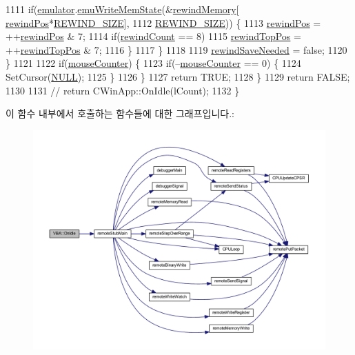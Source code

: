 \begin{DoxyCode}
1111         \textcolor{keywordflow}{if}(\mbox{\hyperlink{class_v_b_a_ab40fc008c6714c3c8670eb8a9085a4a1}{emulator}}.\mbox{\hyperlink{struct_emulated_system_a91e29689742db5aa32a73c2f5698605a}{emuWriteMemState}}(&\mbox{\hyperlink{class_v_b_a_ad2f4e21586cc185a1e6525080532471a}{rewindMemory}}[
      \mbox{\hyperlink{class_v_b_a_a5d8ea18c98b5188813210a84819da5e8}{rewindPos}}*\mbox{\hyperlink{_s_d_l_8cpp_ac23853e466152bcbd456ac1e976f4e84}{REWIND\_SIZE}}], 
1112                                      \mbox{\hyperlink{_s_d_l_8cpp_ac23853e466152bcbd456ac1e976f4e84}{REWIND\_SIZE}})) \{
1113           \mbox{\hyperlink{class_v_b_a_a5d8ea18c98b5188813210a84819da5e8}{rewindPos}} = ++\mbox{\hyperlink{class_v_b_a_a5d8ea18c98b5188813210a84819da5e8}{rewindPos}} & 7;
1114           \textcolor{keywordflow}{if}(\mbox{\hyperlink{class_v_b_a_a39430ba84d3e7205846e24f0484d7880}{rewindCount}} == 8)
1115             \mbox{\hyperlink{class_v_b_a_aa83e33c3d4bb203a5d223a0906a977d8}{rewindTopPos}} = ++\mbox{\hyperlink{class_v_b_a_aa83e33c3d4bb203a5d223a0906a977d8}{rewindTopPos}} & 7;
1116         \}
1117       \}
1118     
1119       \mbox{\hyperlink{class_v_b_a_a3f8cd6f6705f0306f57818e885a50aa3}{rewindSaveNeeded}} = \textcolor{keyword}{false};
1120     \}
1121     
1122     \textcolor{keywordflow}{if}(\mbox{\hyperlink{class_v_b_a_af042fea29b45069293e90bef70c7839a}{mouseCounter}}) \{
1123       \textcolor{keywordflow}{if}(--\mbox{\hyperlink{class_v_b_a_af042fea29b45069293e90bef70c7839a}{mouseCounter}} == 0) \{
1124         SetCursor(\mbox{\hyperlink{getopt1_8c_a070d2ce7b6bb7e5c05602aa8c308d0c4}{NULL}});
1125       \}
1126     \}    
1127     \textcolor{keywordflow}{return} TRUE;
1128   \}
1129   \textcolor{keywordflow}{return} FALSE;
1130   
1131   \textcolor{comment}{//  return CWinApp::OnIdle(lCount);}
1132 \}
\end{DoxyCode}
이 함수 내부에서 호출하는 함수들에 대한 그래프입니다.\+:
\nopagebreak
\begin{figure}[H]
\begin{center}
\leavevmode
\includegraphics[width=350pt]{class_v_b_a_a0296d1fa6a340dffd47dbe623b64475c_cgraph}
\end{center}
\end{figure}
\mbox{\label{class_v_b_a_aa09989acc3edb3991dc98a88655dabdb}} 
